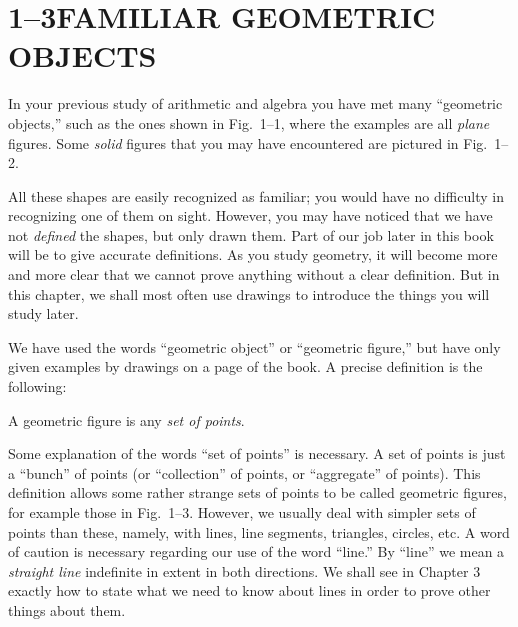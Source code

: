 \documentclass[11pt]{book}
\theoremstyle{bkplain}
\theoremstyle{XIplainnote}
\theoremstyle{bkplain}
\theoremstyle{bkplain}
\begin{document}
\section*{1--3\quad FAMILIAR GEOMETRIC OBJECTS}

In your previous study of arithmetic and algebra you have met many ``geometric
objects,'' such as the ones shown in Fig.~1--1, where the examples are all
\emph{plane} figures. Some \emph{solid} figures that you may have encountered are
pictured in Fig.~1--2.

\FIGIONE

\FIGITWO

All these shapes are easily recognized as familiar; you would have no difficulty
in recognizing one of them on sight. However, you may have noticed that we have
not \emph{defined} the shapes, but only drawn them. Part of our job later in this
book will be to give accurate definitions. As you study geometry, it will become
more and more clear that we cannot prove anything without a clear definition. But
in this chapter, we shall most often use drawings to introduce the things you
will study later.

We have used the words ``geometric object'' or ``geometric figure,'' but have
only given examples by drawings on a page of the book. A precise definition is
the following:

\begin{definition}
A geometric figure is any \emph{set of points}.
\end{definition}

Some explanation of the words ``set of points'' is necessary. A set of points is
just a ``bunch'' of points (or ``collection'' of points, or ``aggregate'' of
points). This definition allows some rather strange sets of points to be called
geometric figures, for example those in Fig.~1--3. However, we usually deal with
simpler sets of points than these, namely, with lines, line segments, triangles,
circles, etc. A word of caution is necessary regarding our use of the word
``line.'' By ``line'' we mean a \emph{straight line} indefinite in extent in both
directions. We shall see in Chapter 3 exactly how to state what we need to know
about lines in order to prove other things about them.

\FIGITHREE
\end{document}
